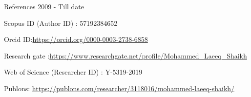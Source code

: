  \begin{cventries}
 {%
 \cventry
 {}
 {References}
 {}%
 {2009 - Till date}%
 {}
    \begin{cvitems}
        {%
         \item {Scopus ID (Author ID) : 57192384652}
         \item {Orcid ID:\url{https://orcid.org/0000-0003-2738-6858}}
         \item {Research gate :\url{https://www.researchgate.net/profile/Mohammed_Laeeq_Shaikh}}
        \item {Web of Science (Researcher ID) : Y-5319-2019}
        \item {Publons: \url{https://publons.com/researcher/3118016/mohammed-laeeq-shaikh/}}
        }%
    \end{cvitems}
 }%

\end{cventries}

